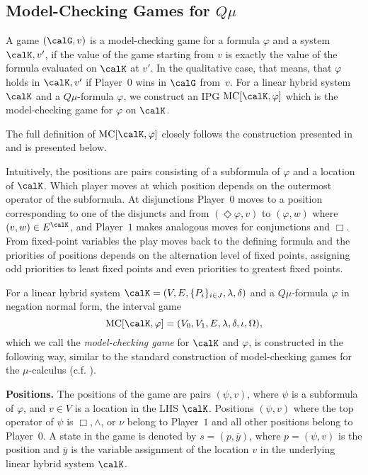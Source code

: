 \documentclass[fleqn,envcountsame]{LMCS}
\newcommand{\Qmu}{\ensuremath{Q\mu}\xspace}
\newcommand{\pzero}{Player~$0$\xspace}
\newcommand{\pone}{Player~$1$\xspace}
\newcommand{\ol}[1]{\ensuremath{\overline{#1}}}
\newcommand{\mc}{\ensuremath{\mathrm{MC}}} \newcommand{\sem}[1]{\ensuremath{\llbracket#1\rrbracket}}
\newcommand{\labels}{\ensuremath{\lambda}}
\newcommand{\coeff}{\ensuremath{\delta}} \newcommand{\indexi}{\ensuremath{\iota}}
\renewcommand\phi{\varphi}
\begin{document}
\subsection{Model-Checking Games for \Qmu} \label{subsec_mc}

A game $(\calG, v)$ is a model-checking game for a formula $\phi$ and
a system $\calK, v'$, if the value of the game starting from $v$ is
exactly the value of the formula evaluated on $\calK$ at $v'$.
In the qualitative case, that means, that $\phi$ holds in $\calK, v'$ if
\pzero wins in $\calG$ from~$v$. For a linear hybrid system $\calK$
and a \Qmu-formula $\phi$, we construct an IPG
$\mc[\calK,\phi]$ which is the model-checking game for $\phi$ on $\calK$.

The full definition of $\mc[\calK,\phi]$ closely follows the construction
presented in~\cite{FGK10} and is presented below.

Intuitively, the positions are pairs consisting of a subformula
of $\phi$ and a location of $\calK$. 
Which player moves at which position depends on the outermost 
operator of the subformula. At disjunctions \pzero moves
to a position corresponding to one of the disjuncts and from 
$(\Diamond \phi, v)$ to $(\phi, w)$ where 
$(v,w) \in E^\calK$, and \pone makes analogous
moves for conjunctions and $\Box$. From fixed-point variables the play
moves back to the defining formula and the priorities
of positions depends on the alternation level of fixed points, 
assigning odd priorities to least fixed points and even priorities 
to greatest fixed points.

\begin{defi}
For a linear hybrid system $\calK = (V, E, \{P_i\}_{i \in J}, \labels, \coeff)$
and a \Qmu-formula $\phi$ in negation normal form, the interval game 
\[ \mc[\calK,\phi] = (V_0, V_1, E, \labels, \coeff, \indexi, \Omega), \]
which we call the \emph{model-checking game} for $\calK$ and $\phi$,
is constructed in the following way, similar to the standard construction
of model-checking games for the $\mu$-calculus (c.f. \cite{FGK10}).
\end{defi}

\textbf{Positions.}
The positions of the game are pairs $(\psi, v)$,
where $\psi$ is a subformula of $\phi$, and
$v \in V$ is a location in the LHS $\calK$.
Positions $(\psi,v)$ where the top operator
of $\psi$ is $\Box, \land$, or $\nu$ belong to \pone and
all other positions belong to \pzero.
A state in the game is denoted by $s = (p, \ol{y})$, where $p=(\psi, v)$
is the position and $\ol{y}$ is the variable assignment of
the location $v$ in the underlying linear hybrid system $\calK$.
\end{document}
